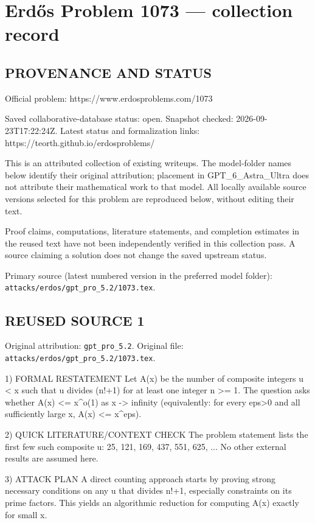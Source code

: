 \section*{Erd\H{o}s Problem 1073 --- collection record}

\subsection*{PROVENANCE AND STATUS}
Official problem: https://www.erdosproblems.com/1073

Saved collaborative-database status: open.
Snapshot checked: 2026-09-23T17:22:24Z.
Latest status and formalization links: https://teorth.github.io/erdosproblems/

This is an attributed collection of existing writeups. The model-folder names below identify their original attribution; placement in GPT\_6\_Astra\_Ultra does not attribute their mathematical work to that model. All locally available source versions selected for this problem are reproduced below, without editing their text.

Proof claims, computations, literature statements, and completion estimates in the reused text have not been independently verified in this collection pass. A source claiming a solution does not change the saved upstream status.

Primary source (latest numbered version in the preferred model folder): \texttt{attacks/erdos/gpt\_pro\_5.2/1073.tex}.

\subsection*{REUSED SOURCE 1}
Original attribution: \texttt{gpt\_pro\_5.2}.
Original file: \texttt{attacks/erdos/gpt\_pro\_5.2/1073.tex}.


1) FORMAL RESTATEMENT
Let A(x) be the number of composite integers u < x such that u divides (n!+1) for at least one integer n >= 1.
The question asks whether A(x) <= x^{o(1)} as x -> infinity (equivalently: for every eps>0 and all sufficiently large x, A(x) <= x^eps).

2) QUICK LITERATURE/CONTEXT CHECK
The problem statement lists the first few such composite u:
  25, 121, 169, 437, 551, 625, ...
No other external results are assumed here.

3) ATTACK PLAN
A direct counting approach starts by proving strong necessary conditions on any u that divides n!+1, especially constraints on its prime factors. This yields an algorithmic reduction for computing A(x) exactly for small x.

